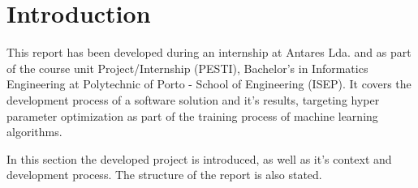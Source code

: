 
\section{Introduction}

This report has been developed during an internship at Antares Lda. and as part of the course unit Project/Internship (PESTI), Bachelor's in Informatics Engineering at Polytechnic of Porto - School of Engineering (ISEP). It covers the development process of a software solution and it's results, targeting hyper parameter optimization as part of the training process of machine learning algorithms.

In this section the developed project is introduced, as well as it's context and development process. The structure of the report is also stated.





